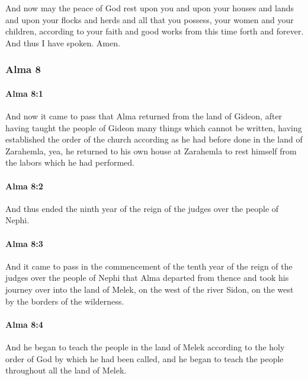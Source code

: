 			And now may the peace of God rest upon you
			and upon your houses and lands
			and upon your flocks and herds and all that you possess,
			your women and your children,
			according to your faith and good works from this time forth and forever.
			And thus I have spoken.
			Amen.

	\subsubsection{Alma 8} %
		\label{ALMA-8}
		
		\paragraph{Alma 8:1} %
			\label{ALMA-8-1}

			And now it came to pass that Alma returned from the land of Gideon,
			after having taught the people of Gideon many things which cannot be written,
			having established the order of the church
			according as he had before done in the land of Zarahemla,
			yea, he returned to his own house at Zarahemla
			to rest himself from the labors which he had performed.

		\paragraph{Alma 8:2} %
			\label{ALMA-8-2}

			And thus ended the ninth year of the reign of the judges over the people of Nephi.

		\paragraph{Alma 8:3} %
			\label{ALMA-8-3}

			And it came to pass in the commencement of the tenth year
			of the reign of the judges over the people of Nephi
			that Alma departed from thence and took his journey
			over into the land of Melek,
			on the west of the river Sidon,
			on the west by the borders of the wilderness.

		\paragraph{Alma 8:4} %
			\label{ALMA-8-4}

			And he began to teach the people in the land of Melek
			according to the holy order of God by which he had been called,
			and he began to teach the people throughout all the land of Melek.

